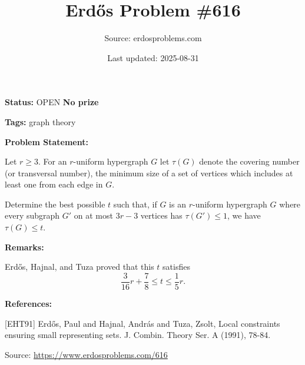 \documentclass{article}
\title{Erd\H{o}s Problem \#616}
\date{Last updated: 2025-08-31}
\author{Source: erdosproblems.com}
\begin{document}
\maketitle

\noindent\textbf{Status:} OPEN \quad \textbf{No prize}

\noindent\textbf{Tags:} graph theory

\medskip
\noindent\textbf{Problem Statement:}

Let $r\geq 3$. For an $r$-uniform hypergraph $G$ let $\tau(G)$ denote the covering number (or transversal number), the minimum size of a set of vertices which includes at least one from each edge in $G$.

Determine the best possible $t$ such that, if $G$ is an $r$-uniform hypergraph $G$ where every subgraph $G'$ on at most $3r-3$ vertices has $\tau(G')\leq 1$, we have $\tau(G)\leq t$.

\bigskip
\noindent\textbf{Remarks:}

Erd\H{o}s, Hajnal, and Tuza \cite{EHT91} proved that this $t$ satisfies\[\frac{3}{16}r+\frac{7}{8}\leq t \leq \frac{1}{5}r.\]

\bigskip
\noindent\textbf{References:}

[EHT91] Erd\H{o}s, Paul and Hajnal, Andr\'{a}s and Tuza, Zsolt, Local constraints ensuring small representing sets. J. Combin. Theory Ser. A (1991), 78-84.

\bigskip
\noindent\small{Source: \url{https://www.erdosproblems.com/616}}
\end{document}
